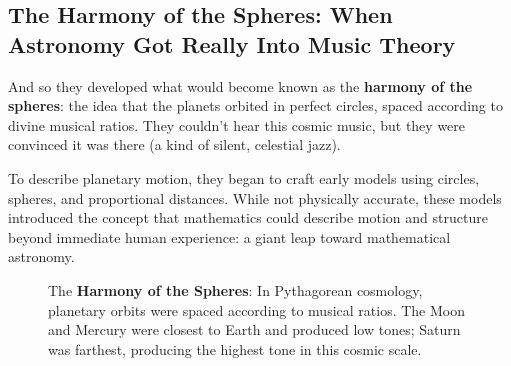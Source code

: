 \subsection{The Harmony of the Spheres: When Astronomy Got Really Into Music Theory}

And so they developed what would become known as the \textbf{harmony of the spheres}: the idea that the planets orbited in perfect circles, spaced according to divine musical ratios. They couldn't hear this cosmic music, but they were convinced it was there (a kind of silent, celestial jazz).

To describe planetary motion, they began to craft early models using circles, spheres, and proportional distances. While not physically accurate, these models introduced the concept that mathematics could describe motion and structure beyond immediate human experience: a giant leap toward mathematical astronomy.

\begin{figure}[H]
   \centering
   \caption{The \textbf{Harmony of the Spheres}: In Pythagorean cosmology, planetary orbits were spaced according to musical ratios. The Moon and Mercury were closest to Earth and produced low tones; Saturn was farthest, producing the highest tone in this cosmic scale.}
\end{figure}

